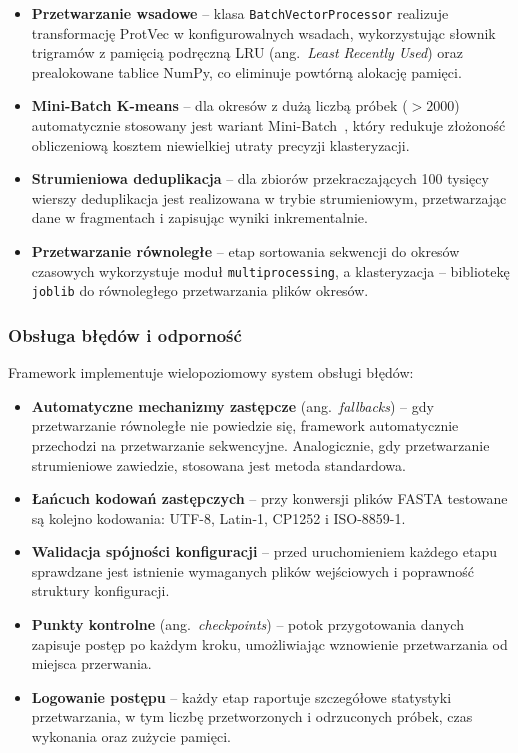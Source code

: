 \begin{itemize}
    \item \textbf{Przetwarzanie wsadowe} -- klasa \texttt{BatchVectorProcessor} realizuje transformację ProtVec w konfigurowalnych wsadach, wykorzystując słownik trigramów z pamięcią podręczną LRU (ang.~\emph{Least Recently Used}) oraz prealokowane tablice NumPy, co eliminuje powtórną alokację pamięci.

    \item \textbf{Mini-Batch K-means} -- dla okresów z dużą liczbą próbek ($> 2000$) automatycznie stosowany jest wariant Mini-Batch~\cite{sculley2010minibatch}, który redukuje złożoność obliczeniową kosztem niewielkiej utraty precyzji klasteryzacji.

    \item \textbf{Strumieniowa deduplikacja} -- dla zbiorów przekraczających 100 tysięcy wierszy deduplikacja jest realizowana w trybie strumieniowym, przetwarzając dane w fragmentach i zapisując wyniki inkrementalnie.

    \item \textbf{Przetwarzanie równoległe} -- etap sortowania sekwencji do okresów czasowych wykorzystuje moduł \texttt{multiprocessing}, a klasteryzacja -- bibliotekę \texttt{joblib} do równoległego przetwarzania plików okresów.
\end{itemize}

\subsubsection{Obsługa błędów i odporność}
\label{subsubsec:obsluga-bledow}

Framework implementuje wielopoziomowy system obsługi błędów:

\begin{itemize}
    \item \textbf{Automatyczne mechanizmy zastępcze} (ang.~\emph{fallbacks}) -- gdy przetwarzanie równoległe nie powiedzie się, framework automatycznie przechodzi na przetwarzanie sekwencyjne. Analogicznie, gdy przetwarzanie strumieniowe zawiedzie, stosowana jest metoda standardowa.

    \item \textbf{Łańcuch kodowań zastępczych} -- przy konwersji plików FASTA testowane są kolejno kodowania: UTF-8, Latin-1, CP1252 i ISO-8859-1.

    \item \textbf{Walidacja spójności konfiguracji} -- przed uruchomieniem każdego etapu sprawdzane jest istnienie wymaganych plików wejściowych i poprawność struktury konfiguracji.

    \item \textbf{Punkty kontrolne} (ang.~\emph{checkpoints}) -- potok przygotowania danych zapisuje postęp po każdym kroku, umożliwiając wznowienie przetwarzania od miejsca przerwania.

    \item \textbf{Logowanie postępu} -- każdy etap raportuje szczegółowe statystyki przetwarzania, w tym liczbę przetworzonych i odrzuconych próbek, czas wykonania oraz zużycie pamięci.
\end{itemize}

